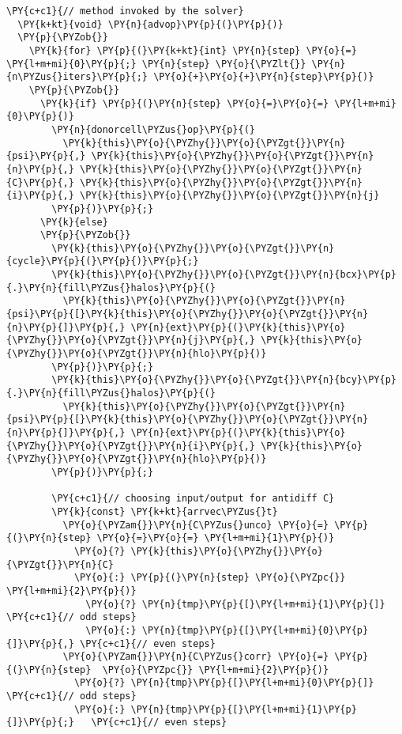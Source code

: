 \begin{Verbatim}[commandchars=\\\{\}]
  \PY{c+c1}{// method invoked by the solver}
  \PY{k+kt}{void} \PY{n}{advop}\PY{p}{(}\PY{p}{)}
  \PY{p}{\PYZob{}}
    \PY{k}{for} \PY{p}{(}\PY{k+kt}{int} \PY{n}{step} \PY{o}{=} \PY{l+m+mi}{0}\PY{p}{;} \PY{n}{step} \PY{o}{\PYZlt{}} \PY{n}{n\PYZus{}iters}\PY{p}{;} \PY{o}{+}\PY{o}{+}\PY{n}{step}\PY{p}{)} 
    \PY{p}{\PYZob{}}
      \PY{k}{if} \PY{p}{(}\PY{n}{step} \PY{o}{=}\PY{o}{=} \PY{l+m+mi}{0}\PY{p}{)} 
        \PY{n}{donorcell\PYZus{}op}\PY{p}{(}
          \PY{k}{this}\PY{o}{\PYZhy{}}\PY{o}{\PYZgt{}}\PY{n}{psi}\PY{p}{,} \PY{k}{this}\PY{o}{\PYZhy{}}\PY{o}{\PYZgt{}}\PY{n}{n}\PY{p}{,} \PY{k}{this}\PY{o}{\PYZhy{}}\PY{o}{\PYZgt{}}\PY{n}{C}\PY{p}{,} \PY{k}{this}\PY{o}{\PYZhy{}}\PY{o}{\PYZgt{}}\PY{n}{i}\PY{p}{,} \PY{k}{this}\PY{o}{\PYZhy{}}\PY{o}{\PYZgt{}}\PY{n}{j}
        \PY{p}{)}\PY{p}{;}
      \PY{k}{else}
      \PY{p}{\PYZob{}}
        \PY{k}{this}\PY{o}{\PYZhy{}}\PY{o}{\PYZgt{}}\PY{n}{cycle}\PY{p}{(}\PY{p}{)}\PY{p}{;}
        \PY{k}{this}\PY{o}{\PYZhy{}}\PY{o}{\PYZgt{}}\PY{n}{bcx}\PY{p}{.}\PY{n}{fill\PYZus{}halos}\PY{p}{(}
          \PY{k}{this}\PY{o}{\PYZhy{}}\PY{o}{\PYZgt{}}\PY{n}{psi}\PY{p}{[}\PY{k}{this}\PY{o}{\PYZhy{}}\PY{o}{\PYZgt{}}\PY{n}{n}\PY{p}{]}\PY{p}{,} \PY{n}{ext}\PY{p}{(}\PY{k}{this}\PY{o}{\PYZhy{}}\PY{o}{\PYZgt{}}\PY{n}{j}\PY{p}{,} \PY{k}{this}\PY{o}{\PYZhy{}}\PY{o}{\PYZgt{}}\PY{n}{hlo}\PY{p}{)}
        \PY{p}{)}\PY{p}{;}
        \PY{k}{this}\PY{o}{\PYZhy{}}\PY{o}{\PYZgt{}}\PY{n}{bcy}\PY{p}{.}\PY{n}{fill\PYZus{}halos}\PY{p}{(}
          \PY{k}{this}\PY{o}{\PYZhy{}}\PY{o}{\PYZgt{}}\PY{n}{psi}\PY{p}{[}\PY{k}{this}\PY{o}{\PYZhy{}}\PY{o}{\PYZgt{}}\PY{n}{n}\PY{p}{]}\PY{p}{,} \PY{n}{ext}\PY{p}{(}\PY{k}{this}\PY{o}{\PYZhy{}}\PY{o}{\PYZgt{}}\PY{n}{i}\PY{p}{,} \PY{k}{this}\PY{o}{\PYZhy{}}\PY{o}{\PYZgt{}}\PY{n}{hlo}\PY{p}{)}
        \PY{p}{)}\PY{p}{;}

        \PY{c+c1}{// choosing input/output for antidiff C}
        \PY{k}{const} \PY{k+kt}{arrvec\PYZus{}t} 
          \PY{o}{\PYZam{}}\PY{n}{C\PYZus{}unco} \PY{o}{=} \PY{p}{(}\PY{n}{step} \PY{o}{=}\PY{o}{=} \PY{l+m+mi}{1}\PY{p}{)} 
            \PY{o}{?} \PY{k}{this}\PY{o}{\PYZhy{}}\PY{o}{\PYZgt{}}\PY{n}{C} 
            \PY{o}{:} \PY{p}{(}\PY{n}{step} \PY{o}{\PYZpc{}} \PY{l+m+mi}{2}\PY{p}{)} 
              \PY{o}{?} \PY{n}{tmp}\PY{p}{[}\PY{l+m+mi}{1}\PY{p}{]}  \PY{c+c1}{// odd steps}
              \PY{o}{:} \PY{n}{tmp}\PY{p}{[}\PY{l+m+mi}{0}\PY{p}{]}\PY{p}{,} \PY{c+c1}{// even steps}
          \PY{o}{\PYZam{}}\PY{n}{C\PYZus{}corr} \PY{o}{=} \PY{p}{(}\PY{n}{step}  \PY{o}{\PYZpc{}} \PY{l+m+mi}{2}\PY{p}{)} 
            \PY{o}{?} \PY{n}{tmp}\PY{p}{[}\PY{l+m+mi}{0}\PY{p}{]}    \PY{c+c1}{// odd steps}
            \PY{o}{:} \PY{n}{tmp}\PY{p}{[}\PY{l+m+mi}{1}\PY{p}{]}\PY{p}{;}   \PY{c+c1}{// even steps}


\end{Verbatim}
